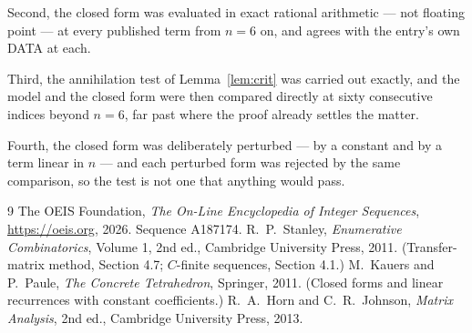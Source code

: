 \documentclass[11pt,a4paper]{article}
\theoremstyle{plain}
\theoremstyle{definition}
\begin{document}
Second, the closed form was evaluated in exact rational arithmetic --- not floating point ---
at every published term from $n=6$ on, and agrees with the entry's own DATA at each.

Third, the annihilation test of Lemma~\ref{lem:crit} was carried out exactly, and the model
and the closed form were then compared directly at sixty consecutive indices beyond
$n=6$, far past where the proof already settles the matter.

Fourth, the closed form was deliberately perturbed --- by a constant and by a term linear in
$n$ --- and each perturbed form was rejected by the same comparison, so the test is not one
that anything would pass.

\begin{thebibliography}{9}
 The OEIS Foundation, \emph{The On-Line Encyclopedia of Integer
Sequences}, \url{https://oeis.org}, 2026. Sequence A187174.
 R.~P.~Stanley, \emph{Enumerative Combinatorics}, Volume 1, 2nd ed.,
Cambridge University Press, 2011. (Transfer-matrix method, Section 4.7; $C$-finite sequences,
Section 4.1.)
 M.~Kauers and P.~Paule, \emph{The Concrete Tetrahedron}, Springer, 2011.
(Closed forms and linear recurrences with constant coefficients.)
 R.~A.~Horn and C.~R.~Johnson, \emph{Matrix Analysis}, 2nd ed., Cambridge
University Press, 2013.
\end{thebibliography}
\end{document}
